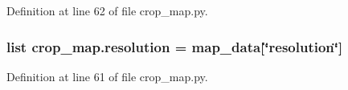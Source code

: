Definition at line 62 of file crop\-\_\-map.\-py.

\hypertarget{namespacecrop__map_a43467b8e29a36d66d95b7ee9f9570572}{
\subsubsection[{resolution}]{\setlength{\rightskip}{0pt plus 5cm}list crop\-\_\-map.\-resolution = {\bf map\-\_\-data}\mbox{[}\char`\"{}resolution\char`\"{}\mbox{]}}}\label{namespacecrop__map_a43467b8e29a36d66d95b7ee9f9570572}


Definition at line 61 of file crop\-\_\-map.\-py.

